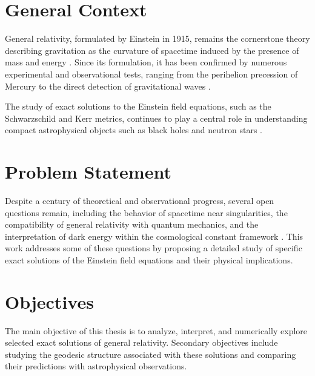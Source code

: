 \clearpage
{}
\reversemarginpar
\setlength{\headwidth}{\textwidth}
\fancyhfoffset[LE,RO]{0pt}
\setcounter{page}{1}
\pagestyle{main}
{}
\label{ch:intro}

\section*{General Context}

General relativity, formulated by Einstein in 1915, remains the cornerstone theory describing gravitation as the curvature of spacetime induced by the presence of mass and energy \cite{einstein1916}. Since its formulation, it has been confirmed by numerous experimental and observational tests, ranging from the perihelion precession of Mercury to the direct detection of gravitational waves \cite{ligo2016}.

The study of exact solutions to the Einstein field equations, such as the Schwarzschild and Kerr metrics, continues to play a central role in understanding compact astrophysical objects such as black holes and neutron stars \cite{misner1973}.

\section*{Problem Statement}

Despite a century of theoretical and observational progress, several open questions remain, including the behavior of spacetime near singularities, the compatibility of general relativity with quantum mechanics, and the interpretation of dark energy within the cosmological constant framework \cite{wald1984}. This work addresses some of these questions by proposing a detailed study of specific exact solutions of the Einstein field equations and their physical implications.

\section*{Objectives}

The main objective of this thesis is to analyze, interpret, and numerically explore selected exact solutions of general relativity. Secondary objectives include studying the geodesic structure associated with these solutions and comparing their predictions with astrophysical observations.


